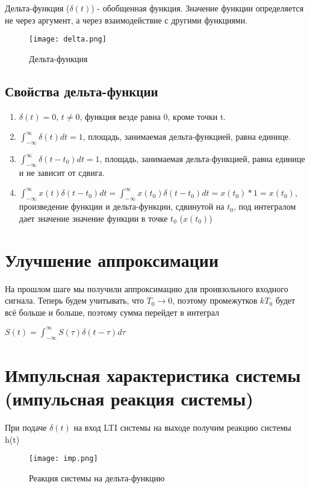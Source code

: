 Дельта-функция ($\delta(t)$) - обобщенная функция. Значение функции определяется не через аргумент, а через взаимодействие с другими
функциями.

\begin{figure}[H]
    \centering
    \texttt{[image: delta.png]}
    \caption{Дельта-функция}
\end{figure}

\subsection*{Свойства дельта-функции}

\begin{enumerate}
    \item $\delta(t) = 0$, $t \neq 0$, функция везде равна 0, кроме точки t.
    \item $\int_{-\infty}^{\infty}\delta(t)dt = 1$, площадь, занимаемая дельта-функцией, равна единице.
    \item $\int_{-\infty}^{\infty}\delta(t-t_0)dt = 1$, площадь, занимаемая дельта-функцией, равна единице и не зависит от сдвига.
    \item $\int_{-\infty}^{\infty}x(t)\delta(t-t_0)dt = \int_{-\infty}^{\infty}x(t_0)\delta(t-t_0)dt = x(t_0) * 1 = x(t_0)$, произведение функции
    и дельта-функции, сдвинутой на $t_0$, под интегралом дает значение значение функции в точке $t_0$ ($x(t_0)$) 
\end{enumerate}

\section*{Улучшение аппроксимации}

На прошлом шаге мы получили аппроксимацию для проивзольного входного сигнала. Теперь будем учитывать, что $T_0 \to 0$, поэтому 
промежутков $kT_0$ будет всё больше и больше, поэтому сумма перейдет в интеграл 

$S(t) = \int_{-\infty}^{\infty}S(\tau)\delta(t-\tau)d\tau$

\section*{Импульсная характеристика системы (импульсная реакция системы)}

При подаче $\delta(t)$ на вход LTI системы на выходе получим реакцию системы h(t)

\begin{figure}[H]
    \centering
    \texttt{[image: imp.png]}
    \caption{Реакция системы на дельта-функцию}
\end{figure}

